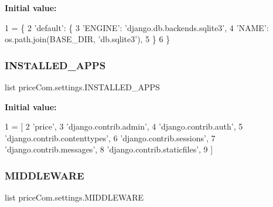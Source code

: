 {\bfseries Initial value\+:}
\begin{DoxyCode}
1 =  \{
2     \textcolor{stringliteral}{'default'}: \{
3         \textcolor{stringliteral}{'ENGINE'}: \textcolor{stringliteral}{'django.db.backends.sqlite3'},
4         \textcolor{stringliteral}{'NAME'}: os.path.join(BASE\_DIR, \textcolor{stringliteral}{'db.sqlite3'}),
5     \}
6 \}
\end{DoxyCode}
\mbox{\label{namespacepriceCom_1_1settings_a35eb2deba1b555c18bc65c510cc8353f}} 
\subsubsection{\texorpdfstring{I\+N\+S\+T\+A\+L\+L\+E\+D\+\_\+\+A\+P\+PS}{INSTALLED\_APPS}}
{\footnotesize\ttfamily list price\+Com.\+settings.\+I\+N\+S\+T\+A\+L\+L\+E\+D\+\_\+\+A\+P\+PS}

{\bfseries Initial value\+:}
\begin{DoxyCode}
1 =  [
2     \textcolor{stringliteral}{'price'},
3     \textcolor{stringliteral}{'django.contrib.admin'},
4     \textcolor{stringliteral}{'django.contrib.auth'},
5     \textcolor{stringliteral}{'django.contrib.contenttypes'},
6     \textcolor{stringliteral}{'django.contrib.sessions'},
7     \textcolor{stringliteral}{'django.contrib.messages'},
8     \textcolor{stringliteral}{'django.contrib.staticfiles'},
9 ]
\end{DoxyCode}
\mbox{\label{namespacepriceCom_1_1settings_a234464e93e85405e9cc8c163df34fb1f}} 
\subsubsection{\texorpdfstring{M\+I\+D\+D\+L\+E\+W\+A\+RE}{MIDDLEWARE}}
{\footnotesize\ttfamily list price\+Com.\+settings.\+M\+I\+D\+D\+L\+E\+W\+A\+RE}

